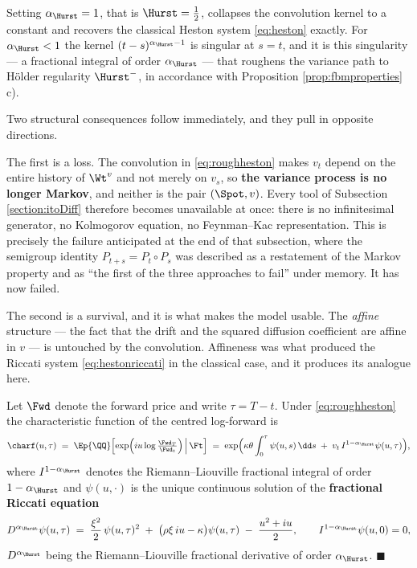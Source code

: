 Setting $\alpha_\Hurst = 1$, that is $\Hurst = \tfrac12$, collapses the convolution kernel to a
constant and recovers the classical Heston system \eqref{eq:heston} exactly. For
$\alpha_\Hurst<1$ the kernel $(t-s)^{\alpha_\Hurst-1}$ is singular at $s=t$, and it is this
singularity --- a fractional integral of order $\alpha_\Hurst$ --- that roughens the variance
path to Hölder regularity $\Hurst^{-}$, in accordance with Proposition \ref{prop:fbmproperties} c).

Two structural consequences follow immediately, and they pull in opposite directions.

The first is a loss. The convolution in \eqref{eq:roughheston} makes $v_t$ depend on the entire
history of $\Wt^v$ and not merely on $v_s$, so \textbf{the variance process is no longer Markov},
and neither is the pair $(\Spot,v)$. Every tool of Subsection \ref{section:itoDiff} therefore
becomes unavailable at once: there is no infinitesimal generator, no Kolmogorov equation, no
Feynman--Kac representation. This is precisely the failure anticipated at the end of that
subsection, where the semigroup identity $P_{t+s} = P_t\circ P_s$ was described as a restatement of
the Markov property and as ``the first of the three approaches to fail'' under memory. It has now
failed.

The second is a survival, and it is what makes the model usable. The \emph{affine} structure ---
the fact that the drift and the squared diffusion coefficient are affine in $v$ --- is untouched by
the convolution. Affineness was what produced the Riccati system \eqref{eq:hestonriccati} in the
classical case, and it produces its analogue here.

\begin{theorem}\label{thm:roughhestoncf}
Let $\Fwd$ denote the forward price and write $\tau = T-t$. Under \eqref{eq:roughheston} the
characteristic function of the centred log-forward is
\begin{equation}\label{eq:roughhestoncf}
\charf(u,\tau) \;=\; \Ep{\QQ}\Bigl[ \exp\Bigl(iu \log\tfrac{\Fwd_T}{\Fwd_t}\Bigr)\,\Big|\,\Ft \Bigr]
\;=\; \exp\Bigl( \kappa\theta \int_0^{\tau}\psi(u,s)\,\dd s \;+\; v_t\, I^{1-\alpha_\Hurst}\psi(u,\tau) \Bigr),
\end{equation}
where $I^{1-\alpha_\Hurst}$ denotes the Riemann--Liouville fractional integral of order
$1-\alpha_\Hurst$ and $\psi(u,\cdot)$ is the unique continuous solution of the \textbf{fractional
Riccati equation}
\begin{equation}\label{eq:fractionalriccati}
D^{\alpha_\Hurst}\psi(u,\tau) \;=\; \frac{\xi^2}{2}\,\psi(u,\tau)^2 \;+\; \bigl(\rho\xi\, i u - \kappa\bigr)\psi(u,\tau) \;-\; \frac{u^2+iu}{2},
\qquad I^{1-\alpha_\Hurst}\psi(u,0) = 0,
\end{equation}
$D^{\alpha_\Hurst}$ being the Riemann--Liouville fractional derivative of order $\alpha_\Hurst$.
\hfill $\blacksquare$
\end{theorem}

